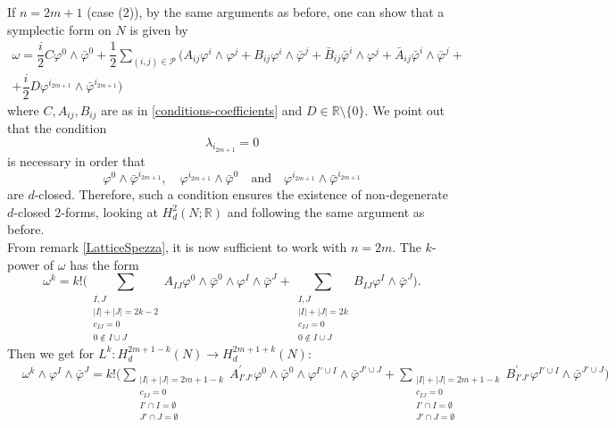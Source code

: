 \documentclass[a4paper, 11pt]{amsart}
\theoremstyle{plain}
\theoremstyle{definition}
\numberwithin{equation}{section}
\begin{document}
\begin{Proof}
    If $n = 2m +1$ (case (2)), by the same arguments as before, one can show that a symplectic form on $N$ is given by 
    \begin{gather*}\label{FormaSimplDimPari}
             \omega = \dfrac{i}{2}C\varphi^{0} \wedge \bar\varphi^{0} + \dfrac{1}{2}\sum_{(i,j) \in \mathcal{P}}^{}(A_{ij}\varphi^{i} \wedge \varphi^{j} + B_{ij}\varphi^{i} \wedge \bar\varphi^{j} + \bar B_{ij}\bar\varphi^{i} \wedge \varphi^{j} + \bar A_{ij}\bar\varphi^{i} \wedge \bar\varphi^{j} + \\
            + \dfrac{i}{2}D\varphi^{i_{2m+1}} \wedge \bar\varphi^{i_{2m+1}})
    \end{gather*}
    where $C, A_{ij}, B_{ij}$ are as in \eqref{conditions-coefficients} and $D \in \mathbb{R} \setminus \{0\}$. We point out that the condition $$\lambda_{i_{2m+1}} = 0$$ is necessary in order that 
    $$\varphi^{0} \wedge \bar\varphi^{i_{2m+1}}, \quad \varphi^{i_{2m+1}} \wedge \bar\varphi^{0} \quad \text{and}\quad \varphi^{i_{2m+1}} \wedge \bar\varphi^{i_{2m+1}}$$
    are $d$-closed. Therefore, such a condition ensures the existence of non-degenerate $d$-closed 2-forms, looking at $H^2_d(N; \mathbb{R})$ and following the same argument as before.\\[5pt]
    From remark \ref{LatticeSpezza}, it is now sufficient to work with $n = 2m$. The $k$-power of $\omega$ has the form
    \[\omega^{k} = k!\bigg(\sum_{\substack{I,J \\ |I| + |J| = 2k-2 \\ 
    c_{IJ} = 0 \\ 0 \notin I \cup J}} A_{IJ}\varphi^{0} \wedge \bar\varphi^{0} \wedge \varphi^{I} \wedge \bar\varphi^{J} +\sum_{\substack{I,J \\ |I| + |J| = 2k \\ 
    c_{IJ} = 0 \\ 0 \notin I \cup J}} B_{IJ}\varphi^{I} \wedge \bar\varphi^{J}\bigg).  \]
    Then we get for $L^{k}: H^{2m+1-k}_{d}(N) \rightarrow H^{2m+1+k}_{d}(N)$:
    \begin{equation*}
    \begin{split}
        &\omega^{k} \wedge \varphi^I \wedge \bar{\varphi}^J = k!\bigg(\sum_{\substack{|I|+|J| = 2m+1-k \\ c_{IJ} = 0 \\I' \cap I = \emptyset \\ J' \cap J = \emptyset}} A^{'}_{I'J'} \varphi^{0} \wedge \bar\varphi^{0} \wedge \varphi^{I' \cup I} \wedge \bar\varphi^{J' \cup J} +\sum_{\substack{|I|+|J| = 2m+1-k \\ c_{IJ} = 0 \\ I' \cap I = \emptyset \\ J' \cap J = \emptyset}} B^{'}_{I'J'}\varphi^{I' \cup I} \wedge \bar\varphi^{J' \cup J}\bigg) \\

\end{split}
\end{equation*}
\end{Proof}
\end{document}
